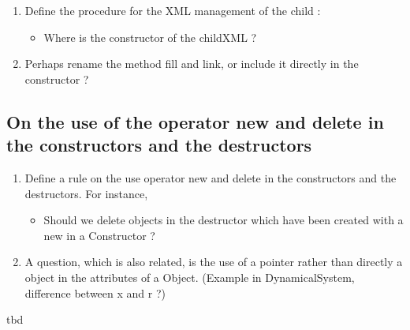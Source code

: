 


 \begin{ndr}
   \begin{enumerate}
   \item Define the procedure for the XML management of the child :
     \begin{itemize}
     \item  Where  is the constructor of the childXML ?
     \end{itemize}
   \item Perhaps rename the method fill and link, or include it directly in the constructor ?
   \end{enumerate}
 \end{ndr}

\clearpage

%





\subsection{On the use of the operator new and delete in the constructors and the destructors}


\begin{ndr}
  \begin{enumerate}
  \item Define a rule on the use  operator new and delete in the constructors and the destructors. For instance, 
    \begin{itemize}
    \item Should we delete objects in the destructor which have been created with a new in a Constructor ?
    \end{itemize}
  \item A question, which is also related, is  the use of a pointer rather than directly a object in the attributes of a Object. (Example in DynamicalSystem, difference between x and r ?)
  \end{enumerate}
\end{ndr}
\ac{tbd}
\clearpage


